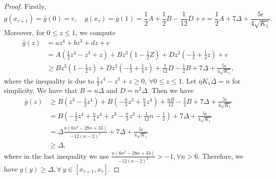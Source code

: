 \documentclass{article}
\newcommand{\paren}[1]{\left( #1 \right)}
\begin{document}
\begin{proof}
Firstly, 
\begin{equation}\nonumber
    g(x_{\tau+1})=\bar{g}(0)=e,\quad g(x_{\tau})=\bar{g}(1)=\frac{1}{2}A+\frac{1}{2}B-\frac{1}{12}D+e=\frac{1}{2}A+7\Delta+\frac{5\epsilon}{4\sqrt{K_1}}.
\end{equation}
Moreover, for $0\leq z\leq 1$, we compute
\begin{equation}\nonumber
    \begin{aligned}
        \bar{g}(z)&=az^4+bz^3+dz+e\\
        &=A\paren{\frac{1}{2}z^4-z^3+z}+Bz^3\paren{1-\frac{1}{2}Z}+Dz^3\paren{-\frac{1}{3}+\frac{1}{4}z}+e\\
        &\geq Bz^3\paren{1-\frac{1}2{z}}+Dz^3\paren{-\frac{1}{3}+\frac{1}{4}z}+\frac{1}{12}D-\frac{1}{2}B+7\Delta+\frac{5\epsilon}{4\sqrt{K_1}},
    \end{aligned}
\end{equation}
where the inequality is due to $\frac{1}{2}z^4-z^3+z\geq0$,  $\forall 0\leq z\leq 1$. Let $\eta K_1\Delta=n$ for simplicity. We have that $B=n\Delta$ and $D=n^2\Delta$. Then we have
\begin{equation}\nonumber
    \begin{aligned}
        \bar{g}(z)&\geq B\paren{z^3-\frac{1}{2}z^4}+B\paren{-\frac{n}{3}z^3+\frac{n}{4}z^4}+\frac{nB}{12}-\frac{1}{2}B+7\Delta+\frac{5\epsilon}{4\sqrt{K_1}}\\
        &=B\paren{-\frac{1}{2}z^4+\frac{n}{4}z^4+z^3-\frac{n}{3}z^3+\frac{1}{12}n-\frac{1}{2}}+7\Delta+\frac{5\epsilon}{4\sqrt{K_1}}\\
        &=\Delta\frac{n\paren{6n^2-28n+33}}{-12\paren{n-2}^3}+7\Delta+\frac{5\epsilon}{4\sqrt{K_1}}\\
        &\geq \Delta,
    \end{aligned}
\end{equation}
where in the last inequality we use $\frac{n\paren{6n^2-28n+33}}{-12\paren{n-2}^3}>-1,\forall n>6$.
Therefore, we have $g(y)\geq \Delta,\forall\ y\in[x_{\tau+1},x_\tau]$.


\end{proof}
\end{document}
